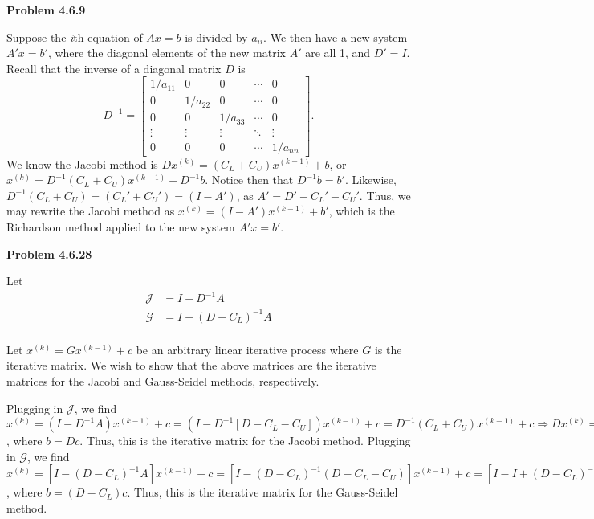 \documentclass{article}
\newcommand{\Problem}[1]{\textbf{Problem #1}}
\begin{document}

\Problem{4.6.9}

Suppose the \textit{i}th equation of $Ax = b$ is divided by $a_{ii}$. We then have a new system $A'x = b'$, where the diagonal elements of the new matrix $A'$ are all 1, and $D' = I$. Recall that the inverse of a diagonal matrix $D$ is 
\begin{equation*}
D^{-1} = 
\begin{bmatrix}
1/a_{11} & 0 & 0 &\cdots & 0\\
0 & 1/a_{22} & 0 &\cdots & 0\\
0 & 0 & 1/a_{33} & \cdots & 0 \\
\vdots & \vdots & \vdots & \ddots & \vdots\\
0 & 0 & 0 & \cdots & 1/a_{nn}
\end{bmatrix}.	
\end{equation*}
We know the Jacobi method is $Dx^{(k)} = (C_L + C_U)x^{(k-1)} + b$, or $x^{(k)} = D^{-1}(C_L + C_U)x^{(k-1)} + D^{-1}b$. Notice then that $D^{-1}b = b'$. Likewise, $D^{-1}(C_L + C_U) = (C_L' + C_U') = (I - A')$, as $A' = D'-C_L'-C_U'$. Thus, we may rewrite the Jacobi method as $x^{(k)} = (I - A')x^{(k-1)} + b'$, which is the Richardson method applied to the new system $A'x = b'$. 

\Problem{4.6.28}

Let 
\begin{align*}
\mathcal{J} &= I - D^{-1}A\\
\mathcal{G} &= I - (D-C_L)^{-1}A\\
\end{align*}

Let $x^{(k)} = Gx^{(k-1)} + c$ be an arbitrary linear iterative process where $G$ is the iterative matrix. We wish to show that the above matrices are the iterative matrices for the Jacobi and Gauss-Seidel methods, respectively. 

Plugging in $\mathcal{J}$, we find $x^{(k)} = (I - D^{-1}A)x^{(k-1)} + c = (I - D^{-1}[D - C_L - C_U])x^{(k-1)} + c = D^{-1}(C_L + C_U)x^{(k-1)} + c \Rightarrow Dx^{(k)} = (C_L + C_U)x^{(k-1)} + b$, where $b = Dc$. Thus, this is the iterative matrix for the Jacobi method. Plugging in $\mathcal{G}$, we find $x^{(k)} = [I - (D-C_L)^{-1}A]x^{(k-1)} + c = [I - (D-C_L)^{-1}(D - C_L - C_U)]x^{(k-1)} + c = [I - I + (D - C_L)^{-1}C_U]x^{(k-1)} + c \Rightarrow (D - C_L)x^{(k)} = C_Ux^{(k-1)} + b$, where $b = (D - C_L)c$. Thus, this is the iterative matrix for the Gauss-Seidel method. 
\end{document}
